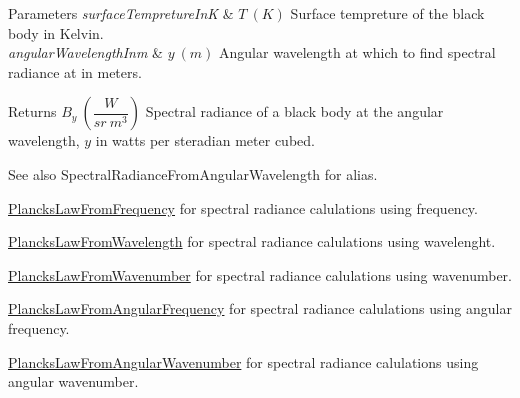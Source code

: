 \begin{DoxyParams}{Parameters}
{\em surface\+Tempreture\+InK} & $T\ (K)$ Surface tempreture of the black body in Kelvin. \\
\hline
{\em angular\+Wavelength\+Inm} & $y\ (m)$ Angular wavelength at which to find spectral radiance at in meters. \\
\hline
\end{DoxyParams}
\begin{DoxyReturn}{Returns}
$B_{y}\ ( \dfrac{W}{sr\ m^3})$ Spectral radiance of a black body at the angular wavelength, $y$ in watts per steradian meter cubed. 
\end{DoxyReturn}
\begin{DoxySeeAlso}{See also}
Spectral\+Radiance\+From\+Angular\+Wavelength for alias. 

\mbox{\hyperlink{group___e_g_x_phys-_electrodynamics-_black_body-_plancks_law_ga68aae82f8a086831358c4a61c8c80ba4}{Plancks\+Law\+From\+Frequency}} for spectral radiance calulations using frequency. 

\mbox{\hyperlink{group___e_g_x_phys-_electrodynamics-_black_body-_plancks_law_ga54639bc031ded51ef78aa82b0457a4dd}{Plancks\+Law\+From\+Wavelength}} for spectral radiance calulations using wavelenght. 

\mbox{\hyperlink{group___e_g_x_phys-_electrodynamics-_black_body-_plancks_law_ga6648ae2a0fbff6735c1e1a04c7cac746}{Plancks\+Law\+From\+Wavenumber}} for spectral radiance calulations using wavenumber. 

\mbox{\hyperlink{group___e_g_x_phys-_electrodynamics-_black_body-_plancks_law_gaac540560c71e30c02b91d22e417b5863}{Plancks\+Law\+From\+Angular\+Frequency}} for spectral radiance calulations using angular frequency. 

\mbox{\hyperlink{group___e_g_x_phys-_electrodynamics-_black_body-_plancks_law_gaa3d3e0fdb77d25bdd40523f9975de902}{Plancks\+Law\+From\+Angular\+Wavenumber}} for spectral radiance calulations using angular wavenumber. 
\end{DoxySeeAlso}
\mbox{\label{group___e_g_x_phys-_electrodynamics-_black_body-_plancks_law_gaa3d3e0fdb77d25bdd40523f9975de902}} 
